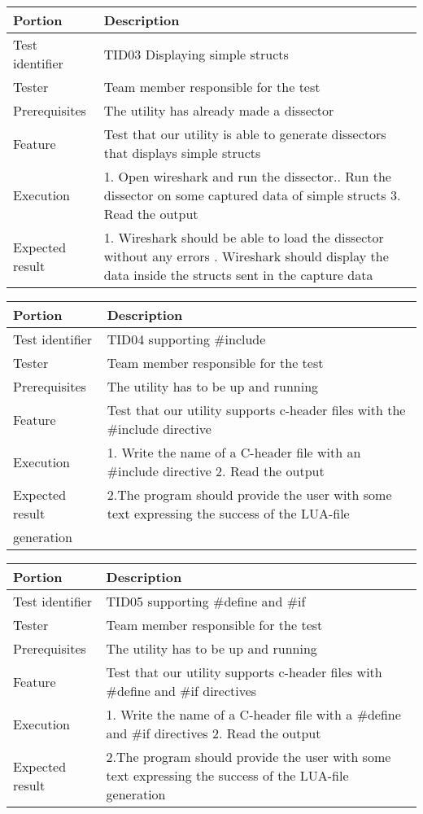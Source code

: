 \documentclass[a4paper, 11pt]{report}
\begin{document}
\begin{table}[H]
\begin{tabularx}{\textwidth}{l X}
\hline\hline
Portion & Description\\[0.5ex]
\hline
Test identifier & TID03 Displaying simple structs\\[0.5ex]
Tester & Team member responsible for the test\\[0.5ex]
Prerequisites & The utility has already made a dissector\\[0.5ex]
Feature & Test that our utility is able to generate dissectors that displays simple structs \\
Execution & 1. Open wireshark and run the dissector.\newline
		2. Run the dissector on some captured data of simple structs
		3. Read the output \\
Expected result & 1. Wireshark should be able to load the dissector without any errors \newline
			3. Wireshark should display the data inside the structs sent in the capture data \\[0.5ex]
\hline\hline
\end{tabularx}


\begin{tabularx}{\textwidth}{l X}
\hline\hline
Portion & Description\\[0.5ex]
\hline
Test identifier & TID04 supporting #include\\[0.5ex]
Tester & Team member responsible for the test\\[0.5ex]
Prerequisites & The utility has to be up and running\\[0.5ex]
Feature & Test that our utility supports c-header files with the #include directive \\
Execution & 1. Write the name of a C-header file with an #include directive
		2. Read the output\\
Expected result & 2.The program should provide the user with some text expressing the success of the LUA-file\\ generation\\[0.5ex]
\hline\hline
\end{tabularx}

\begin{tabularx}{\textwidth}{l X}
\hline\hline
Portion & Description\\[0.5ex]
\hline
Test identifier & TID05 supporting #define and #if\\[0.5ex]
Tester & Team member responsible for the test\\[0.5ex]
Prerequisites & The utility has to be up and running\\[0.5ex]
Feature & Test that our utility supports c-header files with #define and #if directives \\
Execution & 1. Write the name of a C-header file with a #define and #if directives
		2. Read the output\\
Expected result & 2.The program should provide the user with some text expressing the success of the LUA-file generation\\[0.5ex]
\hline\hline
\end{tabularx}


\end{table}
\end{document}
